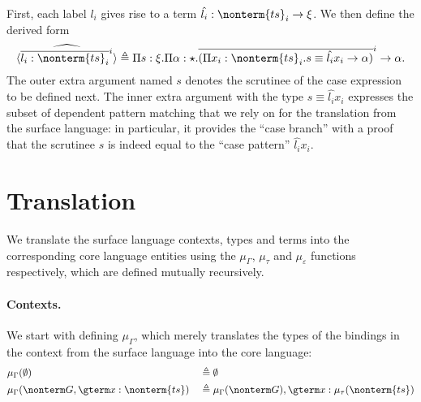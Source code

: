\documentclass[a4paper]{article}
\begin{document}
\begin{itemize}
    First, each label $l_i$ gives rise to a term $\hat{l_i} : \nonterm{ts}_i \rightarrow \xi$.
    We then define the derived form
    \[
      \widehat{\langle \overline{l_i : \nonterm{ts}_i}^i \rangle}
        \triangleq
          \Pi s : \xi.
          \Pi \alpha : \star.
          \overline{(\Pi x_i : \nonterm{ts}_i. s \equiv \hat{l_i} x_i \rightarrow \alpha)}^i \rightarrow \alpha.
    \]
    The outer extra argument named $s$ denotes the scrutinee of the case expression to be defined next.
    The inner extra argument with the type $s \equiv \hat{l_i} x_i$
    expresses the subset of dependent pattern matching
    that we rely on for the translation from the surface language:
    in particular, it provides the ``case branch'' with a proof
    that the scrutinee $s$ is indeed equal to the ``case pattern'' $\hat{l_i} x_i$.
\end{itemize}

\section{Translation}

\newcommand{\tranctx}{\mu_\Gamma}
\newcommand{\tranty}{\mu_\tau}
\newcommand{\tranterm}{\mu_\varepsilon}

We translate the surface language contexts, types and terms into the corresponding core language entities
using the $\mu_\Gamma$, $\mu_\tau$ and $\mu_\varepsilon$ functions respectively,
which are defined mutually recursively.

\paragraph{Contexts.}
We start with defining $\tranctx$,
which merely translates the types of the bindings in the context from the surface language into the core language:
\begin{equation}
\begin{aligned}
  & \tranctx(\emptyset)                                       && \triangleq \emptyset                                               \\
  & \tranctx(\nonterm G, \gterm x : \nonterm{ts})             && \triangleq \tranctx(\nonterm G), \gterm x : \tranty(\nonterm{ts})  \\
\end{aligned}
\end{equation}
\end{document}
